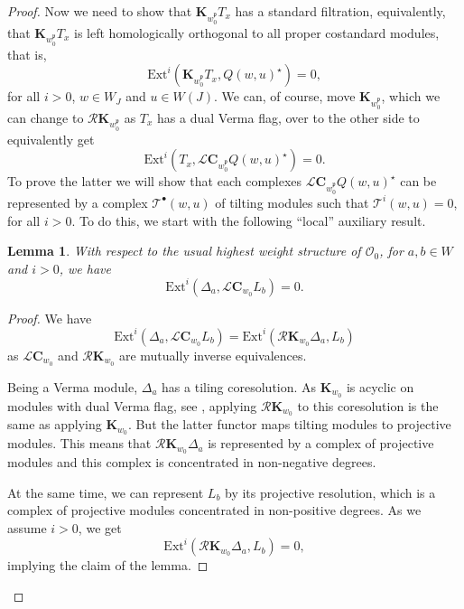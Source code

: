 \documentclass[a4paper]{amsart}
\newtheorem{lemma}[theorem]{Lemma}
\begin{document}
\begin{proof}
Now we need to show that $\mathbf{K}_{w_0^\mathfrak{p}}T_x$
has a standard filtration, equivalently, that 
$\mathbf{K}_{w_0^\mathfrak{p}}T_x$ is left homologically
orthogonal to all proper costandard modules, that is, 
\begin{displaymath}
\mathrm{Ext}^i(\mathbf{K}_{w_0^\mathfrak{p}}T_x,
Q(w,u)^\star)=0, 
\end{displaymath}
for all $i>0$, $w\in W_J$ and $u\in W(J)$. We can, of course, move
$\mathbf{K}_{w_0^\mathfrak{p}}$, which we can change to 
$\mathcal{R}\mathbf{K}_{w_0^\mathfrak{p}}$
as $T_x$ has a dual Verma flag,
over to the other side to equivalently get 
\begin{equation}\label{eq-a1-4}
\mathrm{Ext}^i(T_x,
\mathcal{L}\mathbf{C}_{w_0^\mathfrak{p}}Q(w,u)^\star)=0.
\end{equation}
To prove the latter we will show that each complexes
$\mathcal{L}\mathbf{C}_{w_0^\mathfrak{p}}Q(w,u)^\star$
can be represented by a complex $\mathcal{T}^\bullet(w,u)$
of tilting modules such that $\mathcal{T}^i(w,u)=0$, for all
$i>0$. To do this, we start with the following ``local'' 
auxiliary result.

\begin{lemma}\label{lem-na6}
With respect to the usual highest weight structure of $\mathcal{O}_0$,
for $a,b\in W$ and $i>0$, we have
\begin{displaymath}
\mathrm{Ext}^i(\Delta_a,\mathcal{L}\mathbf{C}_{w_0}L_b)=0. 
\end{displaymath}
\end{lemma}

\begin{proof}
We have
\begin{displaymath}
\mathrm{Ext}^i(\Delta_a,\mathcal{L}\mathbf{C}_{w_0}L_b)=
\mathrm{Ext}^i(\mathcal{R}\mathbf{K}_{w_0}\Delta_a,L_b)
\end{displaymath}
as $\mathcal{L}\mathbf{C}_{w_0}$ and $\mathcal{R}\mathbf{K}_{w_0}$
are mutually inverse equivalences.

Being a Verma module, $\Delta_a$ has a tiling coresolution.
As $\mathbf{K}_{w_0}$ is acyclic on modules with dual Verma flag,
see \cite{MS2},
applying $\mathcal{R}\mathbf{K}_{w_0}$ to this coresolution is the 
same as applying $\mathbf{K}_{w_0}$. But the latter functor maps
tilting modules to projective modules. This means that 
$\mathcal{R}\mathbf{K}_{w_0}\Delta_a$ is represented by a complex
of projective modules and this complex is concentrated in non-negative
degrees.

At the same time, we can represent $L_b$ by its projective 
resolution, which is a complex of projective modules concentrated
in non-positive degrees. As we assume $i>0$, we get 
\begin{displaymath}
\mathrm{Ext}^i(\mathcal{R}\mathbf{K}_{w_0}\Delta_a,L_b)=0,
\end{displaymath}
implying the claim of the lemma.
\end{proof}


\end{proof}
\end{document}
